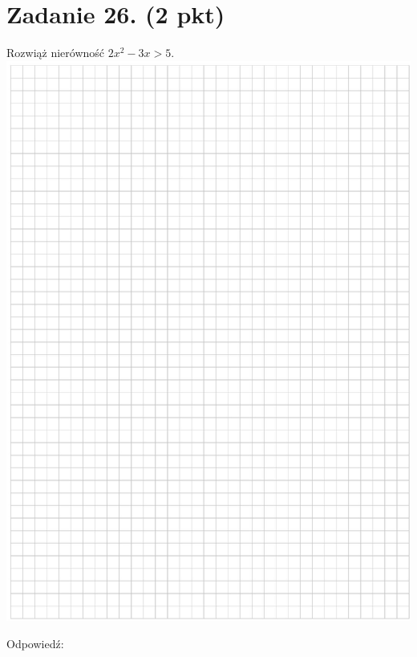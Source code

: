 \documentclass[10pt]{article}
\begin{document}
\section*{Zadanie 26. (2 pkt)}
Rozwiąż nierówność \(2 x^{2}-3 x>5\).\\
\includegraphics[max width=\textwidth, center]{2024_11_21_9383c97fb44abf35abe9g-14}

Odpowiedź: \(\qquad\)
\end{document}
